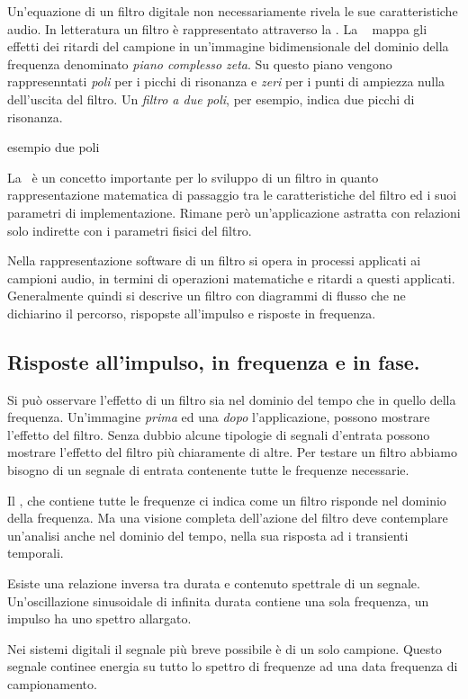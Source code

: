 Un'equazione di un filtro digitale non necessariamente rivela le sue caratteristiche
audio. In letteratura un filtro è rappresentato attraverso la \tz.
La \tz~ mappa gli effetti dei ritardi del campione in un'immagine
bidimensionale del dominio della frequenza denominato \emph{piano complesso zeta}.
Su questo piano vengono rappresenntati \emph{poli} per i picchi di risonanza e
\emph{zeri} per i punti di ampiezza nulla dell'uscita del filtro. Un \emph{filtro
a due poli}, per esempio, indica due picchi di risonanza.

esempio due poli

La \tz~è un concetto importante per lo sviluppo di un filtro in quanto rappresentazione
matematica di passaggio tra le caratteristiche del filtro ed i suoi parametri di
implementazione. Rimane però un'applicazione astratta con relazioni solo indirette
con i parametri fisici del filtro.

Nella rappresentazione software di un filtro si opera in processi applicati
ai campioni audio, in termini di operazioni matematiche e ritardi a questi applicati.
Generalmente quindi si descrive un filtro con diagrammi di flusso che ne dichiarino
il percorso, rispopste all'impulso e risposte in frequenza.

\subsection{Risposte all'impulso, in frequenza e in fase.}

Si può osservare l'effetto di un filtro sia nel dominio del tempo che in quello
della frequenza. Un'immagine \emph{prima} ed una \emph{dopo} l'applicazione, possono mostrare l'effetto del filtro. Senza dubbio alcune tipologie di segnali d'entrata
possono mostrare l'effetto del filtro più chiaramente di altre. Per testare un
filtro abbiamo bisogno di un segnale di entrata contenente tutte le frequenze necessarie.

Il \rb, che contiene tutte le frequenze ci indica come un filtro risponde nel dominio
della frequenza. Ma una visione completa dell'azione del filtro deve contemplare
un'analisi anche nel dominio del tempo, nella sua risposta ad i transienti temporali.

Esiste una relazione inversa tra durata e contenuto spettrale di un segnale. Un'oscillazione
sinusoidale di infinita durata contiene una sola frequenza, un impulso ha uno spettro
allargato.

Nei sistemi digitali il segnale più breve possibile è di un solo campione. Questo
segnale continee energia su tutto lo spettro di frequenze ad una data frequenza
di campionamento.

